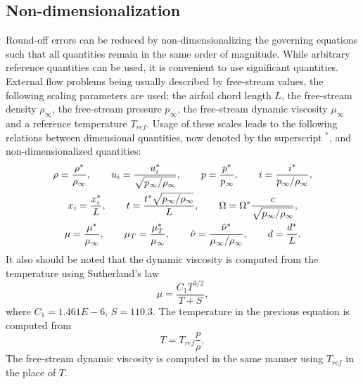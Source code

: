 \subsection{Non-dimensionalization}
\label{syn:nondim}
%
Round-off errors can be reduced by non-dimensionalizing the governing equations such that all quantities remain in the same order of magnitude. While arbitrary reference quantities can be used, it is convenient to use significant quantities. External flow problems being usually described by free-stream values, the following scaling parameters are used: the airfoil chord length $L$, the free-stream density $\rho_\infty$, the free-stream pressure $p_\infty$, the free-stream dynamic viscosity $\mu_\infty$ and a reference temperature $T_{ref}$. Usage of these scales leads to the following relations between dimensional quantities, now denoted by the superscript $^*$, and non-dimensionalized quantities:
\begin{gather*}
    \rho = \frac{\rho^*}{\rho_\infty}, \quad\quad
    u_i = \frac{u_i^*}{\sqrt{p_\infty/\rho_\infty}}, \quad\quad
    p = \frac{p^*}{p_\infty}, \quad\quad
    i = \frac{i^*}{p_\infty/\rho_\infty}, \\
    x_i = \frac{x_i^*}{L}, \quad\quad
    t = \frac{t^*\sqrt{p_\infty/\rho_\infty}}{L}, \quad\quad
    \Omega = \Omega^*\frac{c}{\sqrt{p_\infty/\rho_\infty}}, \\
    \mu = \frac{\mu^*}{\mu_\infty}, \quad\quad
    \mu_T = \frac{\mu^*_T}{\mu_\infty}, \quad\quad
    \sa = \frac{\sa^*}{\mu_\infty/\rho_\infty}, \quad\quad
    d = \frac{d^*}{L}.
\end{gather*}
It also should be noted that the dynamic viscosity is computed from the temperature using Sutherland's law
\begin{equation*}
    \mu = \frac{C_1 T^{3/2}}{T + S},
\end{equation*}
where $C_1 = 1.461E-6$, $S = 110.3$. The temperature in the previous equation is computed from
\begin{equation*}
    T = T_{ref} \frac{p}{\rho},
\end{equation*}
The free-stream dynamic viscosity is computed in the same manner using $T_{ref}$ in the place of $T$. 

